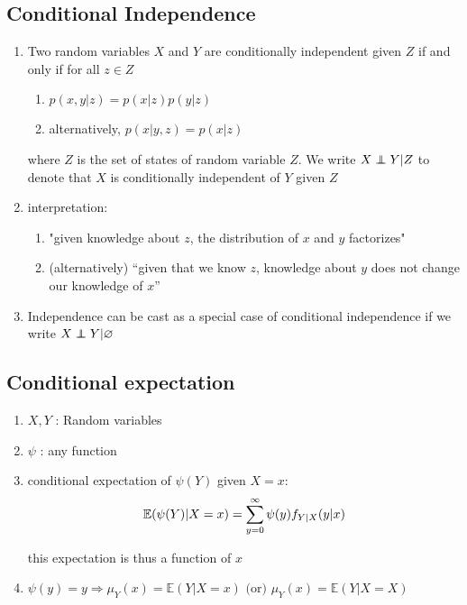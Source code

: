 \subsection{Conditional Independence \cite{mfml-1}} \label{Multivariate Distributions: Conditional Independence}

\begin{enumerate}
    \item Two random variables $X$ and $Y$ are conditionally independent given $Z$ if and only if for all $z \in Z$
    \begin{enumerate}
        \item $p(x, y | z) = p(x | z)p(y | z)$
        \item alternatively, $p(x | y, z) = p(x | z)$
    \end{enumerate}

    where $Z$ is the set of states of random variable $Z$. We write $X \perp\!\!\!\!\perp Y | Z$ to denote that $X$ is conditionally independent of $Y$ given $Z$

    \item interpretation:
    \begin{enumerate}
        \item "given knowledge about $z$, the distribution of $x$ and $y$ factorizes"

        \item (alternatively) “given that we know $z$, knowledge about $y$ does not change our knowledge of $x$”
    \end{enumerate}

    \item Independence can be cast as a special case of conditional independence if we write $X \perp\!\!\!\!\perp Y | \varnothing$
\end{enumerate}


\subsection{Conditional expectation \cite{ism-1}} \label{Multivariate Distributions: Conditional expectation}

\begin{enumerate}
    \item[] $X, Y$ : Random variables
    
    \item[] $\psi$ : any function

    \item conditional expectation of $\psi(Y)$ given $X = x$:
    \[
        \mathbb{E}(\psi(Y)|X=x)
        = \displaystyle\sum_{y=0}^{\infty}
        \psi(y)f_{Y|X}(y|x)
    \]

    this expectation is thus a function of $x$

    \item $
        \psi(y) = y
        \Rightarrow
        \mu_Y(x) = \mathbb{E}(Y|X = x)
        \text{ (or) }
        \mu_Y(x) = \mathbb{E}(Y|X = X)
    $
\end{enumerate}


